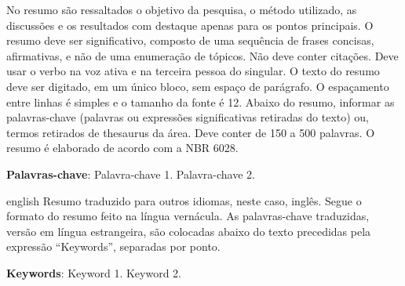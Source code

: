 \documentclass[
	12pt,				%
	oneside,			%
	a4paper,			%
	chapter=TITLE,		%
	section=TITLE,		%
	english,			%
	brazil				%
	]{abntex2}
\begin{document}
\setlength{\absparsep}{18pt} %
\begin{resumo}
	\SingleSpacing
  No resumo são ressaltados o objetivo da pesquisa, o método utilizado, as discussões e os resultados com destaque apenas para os pontos principais. O resumo deve ser significativo, composto de uma sequência de frases concisas, afirmativas, e não de uma enumeração de tópicos. Não deve conter citações. Deve usar o verbo na voz ativa e na terceira pessoa do singular. O texto do resumo deve ser digitado, em um único bloco, sem espaço de parágrafo. O espaçamento entre linhas é simples e o tamanho da fonte é 12. Abaixo do resumo, informar as palavras-chave (palavras ou expressões significativas retiradas do texto) ou, termos retirados de thesaurus da área. Deve conter de 150 a 500 palavras. O resumo é elaborado de acordo com a NBR 6028.

  \textbf{Palavras-chave}:
    Palavra-chave 1.
    Palavra-chave 2.
  \end{resumo}
\begin{resumo}[Abstract]
	\SingleSpacing
	\begin{otherlanguage*}{english}
		Resumo traduzido para outros idiomas, neste caso, inglês. Segue o formato do resumo feito na língua vernácula. As palavras-chave traduzidas, versão em língua estrangeira, são colocadas abaixo do texto precedidas pela expressão ``Keywords'', separadas por ponto.

		\textbf{Keywords}:
	      Keyword 1.
        Keyword 2.
    	\end{otherlanguage*}
\end{resumo}
%
%
%
\end{document}
